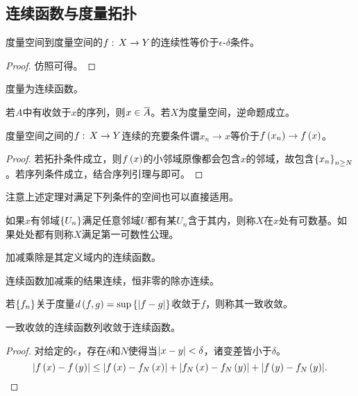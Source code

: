 \documentclass{ctexrep}
\begin{document}
  \subsection{连续函数与度量拓扑}
  \begin{theorem}
    \label{thm:contineqdeltaepsilon}
    度量空间到度量空间的$f:\, X \rightarrow Y$的连续性等价于$\epsilon$-$\delta$条件。
  \end{theorem}
  \begin{proof}
    仿照可得。
  \end{proof}
  \begin{corollary}
  \label{coll:metricscontin}
    度量为连续函数。
  \end{corollary}
  \begin{lemma}[序列引理]
    \label{lem:seq}
    若$A$中有收敛于$x$的序列，则$x\in\clo{A}$。若$X$为度量空间，逆命题成立。
  \end{lemma}
  \begin{theorem}
    \label{thm:matricscontineq}
    度量空间之间的$f:\, X \rightarrow Y$连续的充要条件谓$x_n\rightarrow x$等价于$f\left(x_n\right)\rightarrow f\left(x\right)$。
  \end{theorem}
  \begin{proof}
    若拓扑条件成立，则$f\left(x\right)$的小邻域原像都会包含$x$的邻域，故包含$\left\{x_n\right\}_{n\ge N}$。若序列条件成立，结合序列引理与即可。
  \end{proof}
  注意上述定理对满足下列条件的空间也可以直接适用。
  \begin{definition}
    如果$x$有邻域$\left\{U_n\right\}$满足任意邻域$U$都有某$U_n$含于其内，则称$X$在$x$处有可数基。如果处处都有则称$X$满足第一可数性公理。
  \end{definition}
  \begin{lemma}
    \label{lem:asmd}
    加减乘除是其定义域内的连续函数。
  \end{lemma}
  \begin{theorem}
    \label{thm:continasmd}
    连续函数加减乘的结果连续，恒非零的除亦连续。
  \end{theorem}
  \begin{definition}
    若$\left\{f_n\right\}$关于度量$d\left(f,g\right)=\sup\left\{\abs{f-g}\right\}$收敛于$f$，则称其一致收敛。
  \end{definition}
  \begin{theorem}
    \label{thm:uniformconvergecontin}
    一致收敛的连续函数列收敛于连续函数。
  \end{theorem}
  \begin{proof}
    对给定的$\epsilon$，存在$\delta$和$N$使得当$\abs{x-y}<\delta$，诸变差皆小于$\delta$。
    \[ \abs{f\left(x\right)-f\left(y\right)} \le \abs{f\left(x\right)-f_N\left(x\right)} +  \abs{f_N\left(x\right)-f_N\left(y\right)} +  \abs{f\left(y\right)-f_N\left(y\right)}.\qedhere\]
  \end{proof}
\end{document}
